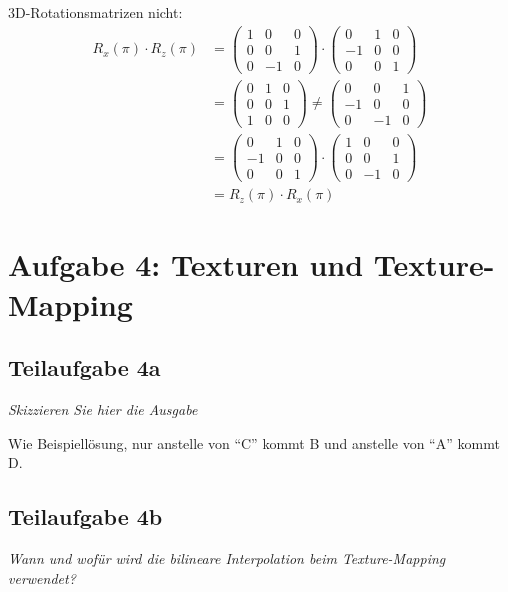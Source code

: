 \documentclass[a4paper]{scrartcl}
\begin{document}
3D-Rotationsmatrizen nicht:
\begin{align}
R_x(\pi) \cdot R_z(\pi)
&= \begin{pmatrix}1 & 0 & 0\\ 0 & 0 & 1\\0 & -1 & 0\end{pmatrix} \cdot
  \begin{pmatrix}0 & 1 & 0\\-1 & 0 & 0\\0 &  0 & 1\end{pmatrix} \\
 &=
  \begin{pmatrix}0 & 1 & 0\\ 0 & 0 & 1\\1 &  0 & 0\end{pmatrix} \neq
  \begin{pmatrix}0 & 0 & 1\\-1 & 0 & 0\\0 & -1 & 0\end{pmatrix} \\
 &=
  \begin{pmatrix}0 & 1 & 0\\-1 & 0 & 0\\0 &  0 & 1\end{pmatrix} \cdot
  \begin{pmatrix}1 & 0 & 0\\ 0 & 0 & 1\\0 & -1 & 0\end{pmatrix} \\
 &= R_z(\pi) \cdot R_x(\pi)
\end{align}

\section*{Aufgabe 4: Texturen und Texture-Mapping}
\subsection*{Teilaufgabe 4a}
\textit{Skizzieren Sie hier die Ausgabe}

Wie Beispiellösung, nur anstelle von \enquote{C} kommt B und anstelle von \enquote{A}
kommt D.

\subsection*{Teilaufgabe 4b}
\textit{Wann und wofür wird die bilineare Interpolation beim Texture-Mapping verwendet?}
\end{document}

